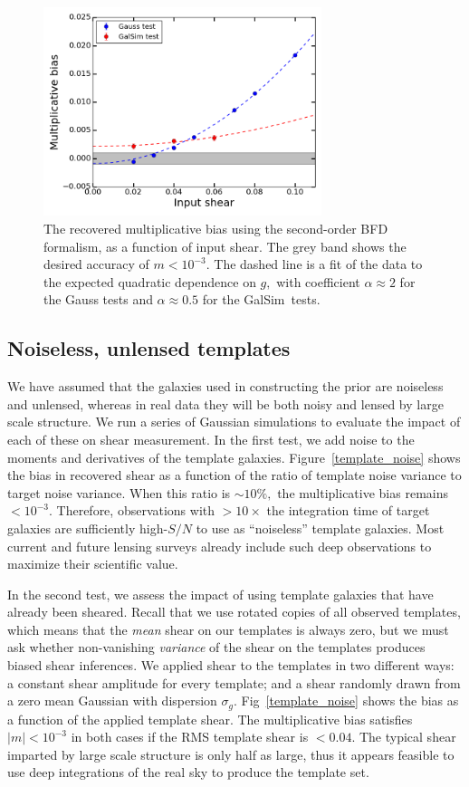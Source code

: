 \documentclass[11pt,preprint,flushrt]{aastex}
\newcommand{\galsim}{{\sc GalSim}}
\newcommand\edit[1]{#1}
\begin{document}
\begin{figure}[ht]
\centering
\includegraphics[width=3.2in]{bias_shear_4d_pixel.png}
\caption{ The recovered multiplicative bias using the second-order BFD
  formalism, as a function of
input shear.  The grey band shows the 
desired accuracy of $m<10^{-3}$.  The dashed line is a fit of the data to the
expected quadratic dependence on $g,$ with coefficient $\alpha\approx
2$ for the Gauss tests and $\alpha\approx0.5$ for the \galsim\ tests.}
\label{bias_shear}
\end{figure}

\subsection{Noiseless, unlensed templates}

We have assumed that the galaxies used in constructing the prior are noiseless
and unlensed, whereas in real data they will be both noisy and lensed by large scale
structure.  We run a series of Gaussian simulations to evaluate
the impact of each of these on shear measurement.  In the first test, we add
noise to the moments and derivatives of the template galaxies.  Figure~\ref{template_noise} shows
the bias in recovered shear as a function of the ratio of template
noise variance to target noise variance.  When this ratio is
$\sim 10\%,$ the 
multiplicative bias remains $<10^{-3}.$  Therefore, observations with
$>10\times$ the integration time of target galaxies are sufficiently
high-$S/N$ to use as ``noiseless'' template galaxies.  Most
current and future lensing surveys already include such deep
observations to maximize their scientific value.

In the second test, we assess the impact of using template galaxies
that have already been sheared.  Recall that we use rotated copies of
all observed templates, which means that the \emph{mean} shear on our
templates is always zero, but we must ask whether non-vanishing \emph{variance}
of the shear on the templates produces biased shear inferences.
We applied shear to the templates in two different 
ways: a constant shear amplitude for every template; and a shear
randomly drawn from a zero mean Gaussian with dispersion $\sigma_g.$
Fig~\ref{template_noise}
shows the bias as a function of the applied template shear.  The
multiplicative bias satisfies $|m|<10^{-3}$ in both cases
if the RMS template shear is $<0.04$.  
\edit{The typical shear imparted by large scale structure is only half
  as large, thus it
appears feasible to use deep integrations of the real sky to produce
the template set.}
\end{document}
